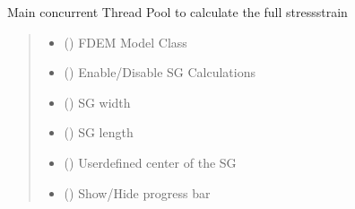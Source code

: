 \documentclass[letterpaper,10pt,english]{sphinxmanual}
\begin{document}
\begin{fulllineitems}
\label{\detokenize{pyfdempp:pyfdempp.complete_BD_thread_pool_generators.main}}
\pysigstartsignatures
{}
\pysigstopsignatures
\sphinxAtStartPar
Main concurrent Thread Pool to calculate the full stress\sphinxhyphen{}strain
\begin{quote}\begin{description}
\begin{itemize}
\item {} 
\sphinxAtStartPar
{} () \textendash{} FDEM Model Class

\item {} 
\sphinxAtStartPar
{} () \textendash{} Enable/Disable SG Calculations

\item {} 
\sphinxAtStartPar
{} () \textendash{} SG width

\item {} 
\sphinxAtStartPar
{} () \textendash{} SG length

\item {} 
\sphinxAtStartPar
{} (\sphinxstyleliteralemphasis{\sphinxupquote{{[}}}\sphinxstyleliteralemphasis{\sphinxupquote{, }}\sphinxstyleliteralemphasis{\sphinxupquote{, }}\sphinxstyleliteralemphasis{\sphinxupquote{{]}}}) \textendash{} User\sphinxhyphen{}defined center of the SG

\item {} 
\sphinxAtStartPar
{} () \textendash{} Show/Hide progress bar


\end{itemize}
\end{description}
\end{quote}
\end{fulllineitems}
\end{document}

